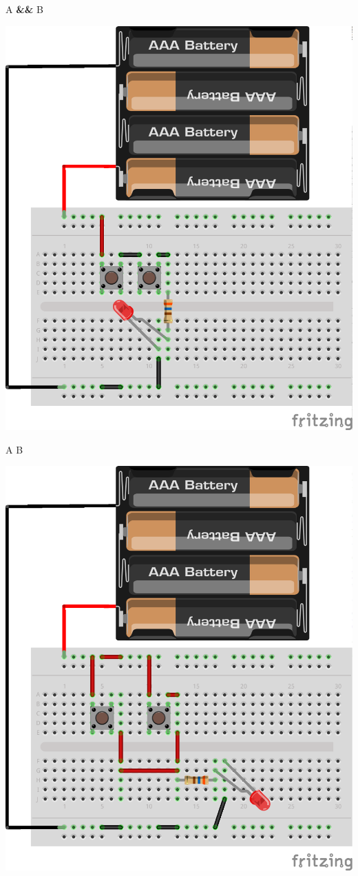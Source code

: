 {\Large A \textbf{\&\&} B}
\begin{center}
	\includegraphics[height=.8\textheight]{./IMG/LED_bb-and.png}
\end{center}

\vfill\columnbreak

{\Large A \textbf{\textbar\textbar} B}
\begin{center}
	\includegraphics[height=.8\textheight]{./IMG/LED_bb-or.png}
\end{center}

\vfill\columnbreak